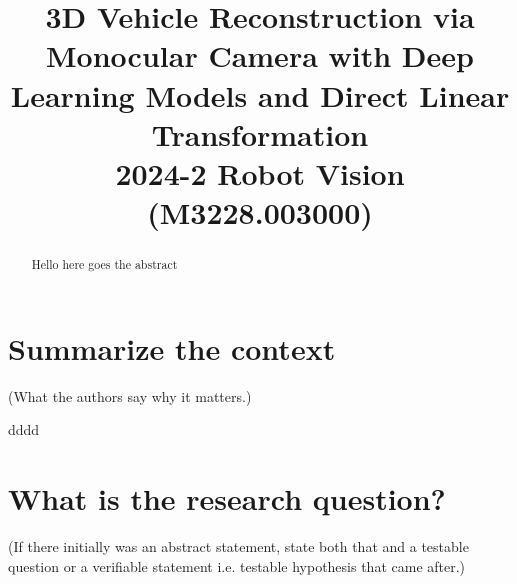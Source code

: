 \documentclass[conference]{IEEEtran}
\begin{document}
\title{3D Vehicle Reconstruction via Monocular Camera with Deep Learning Models and Direct Linear Transformation\\
{\footnotesize 2024-2 Robot Vision (M3228.003000)}
}

\author{
    \and
    \and  
}

\maketitle

\begin{abstract}
    Hello here goes the abstract
\end{abstract}

\section{Summarize the context}
\begin{center}
    \cite{main-article}
    (What the authors say why it matters.)
\end{center}

dddd

\section{What is the research question?}
\begin{center}
    (If there initially was an abstract statement, state both that and a testable question or a verifiable statement i.e. testable hypothesis that came after.)
\end{center}
\end{document}

